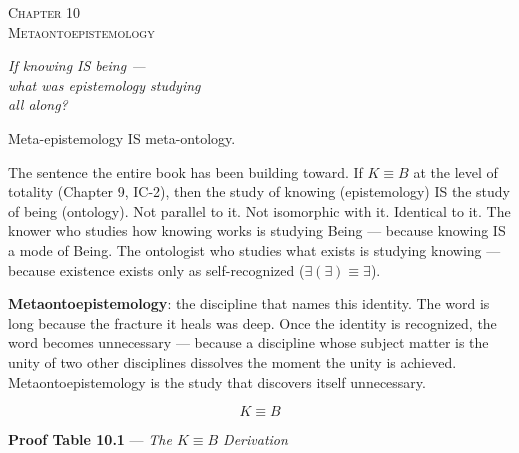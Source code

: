 \documentclass[10pt, openany, oneside]{book}
\renewcommand{\large}{\fontsize{11.5}{14}\selectfont}
\renewcommand{\huge}{\fontsize{17}{21}\selectfont}
\begin{document}
\newpage

\begin{center}
    {\huge\scshape Chapter 10}\\[0.3em]
    {\large\scshape Metaontoepistemology}
\end{center}

\vspace{1.5em}

\begin{center}
    \itshape
    If knowing IS being ---\\
    what was epistemology studying\\
    all along?
\end{center}

\vspace{2em}


\noindent Meta-epistemology IS meta-ontology.

The sentence the entire book has been building toward. If $K \equiv B$ at the level of totality (Chapter 9, IC-2), then the study of knowing (epistemology) IS the study of being (ontology). Not parallel to it. Not isomorphic with it. Identical to it. The knower who studies how knowing works is studying Being --- because knowing IS a mode of Being. The ontologist who studies what exists is studying knowing --- because existence exists only as self-recognized ($\exists(\exists) \equiv \exists$).

\textbf{Metaontoepistemology}: the discipline that names this identity. The word is long because the fracture it heals was deep. Once the identity is recognized, the word becomes unnecessary --- because a discipline whose subject matter is the unity of two other disciplines dissolves the moment the unity is achieved. Metaontoepistemology is the study that discovers itself unnecessary.

$$\boxed{K \equiv B}$$

\vspace{0.5em}

\textbf{Proof Table 10.1} --- \textit{The $K \equiv B$ Derivation}

\vspace{0.5em}
\end{document}

